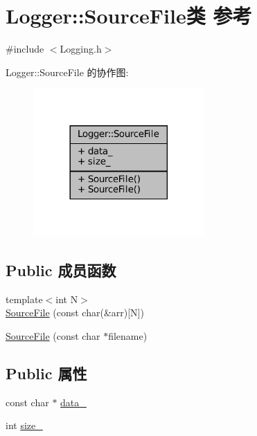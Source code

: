 \hypertarget{classmuduo_1_1Logger_1_1SourceFile}{}\section{Logger\+:\+:Source\+File类 参考}
\label{classmuduo_1_1Logger_1_1SourceFile}


{\ttfamily \#include $<$Logging.\+h$>$}



Logger\+:\+:Source\+File 的协作图\+:
\nopagebreak
\begin{figure}[H]
\begin{center}
\leavevmode
\includegraphics[width=185pt]{classmuduo_1_1Logger_1_1SourceFile__coll__graph}
\end{center}
\end{figure}
\subsection*{Public 成员函数}
\begin{DoxyCompactItemize}
\item 
{\footnotesize template$<$int N$>$ }\\\hyperlink{classmuduo_1_1Logger_1_1SourceFile_a2ff22c1f1de623d25be007ee16dabadc}{Source\+File} (const char(\&arr)\mbox{[}N\mbox{]})
\item 
\hyperlink{classmuduo_1_1Logger_1_1SourceFile_af8e72e2a7d7b9aa59458cf65c20f46d8}{Source\+File} (const char $\ast$filename)
\end{DoxyCompactItemize}
\subsection*{Public 属性}
\begin{DoxyCompactItemize}
\item 
const char $\ast$ \hyperlink{classmuduo_1_1Logger_1_1SourceFile_a87cb119678e603084928af555fe13e36}{data\+\_\+}
\item 
int \hyperlink{classmuduo_1_1Logger_1_1SourceFile_a6947fa5d6ba628dd62d59ffbad8b8d80}{size\+\_\+}
\end{DoxyCompactItemize}


